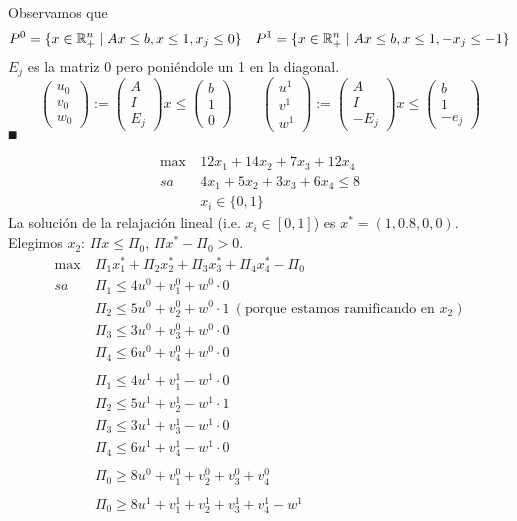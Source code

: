 \documentclass[MIOP.tex]{subfiles}
\begin{document}
\begin{dem}
Observamos que
$$
P^0=\{x\in\mathbb{R}^n_+\mid Ax \leq b, x\leq 1, x_j \leq 0\} \quad P^1=\{x\in\mathbb{R}^n_+\mid Ax \leq b, x\leq 1, -x_j \leq -1\}
$$
$E_j$ es la matriz 0 pero poniéndole un 1 en la diagonal.
$$
\begin{pmatrix}
u_0\\
v_0\\
w_0
\end{pmatrix}:=\begin{pmatrix}
A\\
I\\
E_j
\end{pmatrix}x \leq 
\begin{pmatrix}
b\\
1\\
0
\end{pmatrix}
\qquad
\begin{pmatrix}
u^1\\
v^1\\
w^1
\end{pmatrix} :=
\begin{pmatrix}
A\\
I\\
-E_j
\end{pmatrix}x \leq 
\begin{pmatrix}
b\\
1\\
-e_j
\end{pmatrix}
$$
$\QED$
\end{dem}

\begin{ej}
\begin{align*}
\max\ & 12x_1+14x_2+7x_3+12x_4\\
sa\ & 4x_1+5x_2+3x_3+6x_4\leq 8\\
& x_i\in\{0,1\}
\end{align*}
La solución de la relajación lineal (i.e. $x_i\in[0,1]$) es $x^*=(1, 0.8, 0, 0)$. Elegimos $x_2$: $\Pi x\leq \Pi_0$, $\Pi x^*-\Pi_0>0$. 
\begin{align*}
\max\ & \Pi_1x^*_1+\Pi_2x^*_2+\Pi_3x^*_3+\Pi_4x^*_4-\Pi_0\\
sa\ & \Pi_1\leq 4u^0+v_1^0+w^0\cdot 0\\
& \Pi_2\leq 5u^0+v_2^0+w^0\cdot 1\ (\text{porque estamos ramificando en }x_2)\\
& \Pi_3\leq 3u^0+v_3^0+w^0\cdot 0\\
&\Pi_4\leq 6u^0+v_4^0+w^0\cdot 0\\
\\
& \Pi_1\leq 4u^1+v_1^1-w^1\cdot 0\\
& \Pi_2\leq 5u^1+v_2^1-w^1\cdot 1\\
& \Pi_3\leq 3u^1+v_3^1-w^1\cdot 0\\
&\Pi_4\leq 6u^1+v_4^1-w^1\cdot 0\\
\\
&\Pi_0\geq 8u^0+v_1^0+v_2^0+v_3^0+v_4^0\\
\\
&\Pi_0\geq 8u^1+v_1^1+v_2^1+v_3^1+v_4^1-w^1
\end{align*}
\end{ej}
\end{document}
